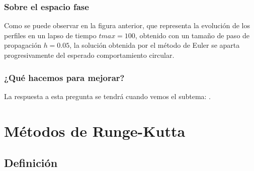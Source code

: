 \documentclass[12pt]{beamer}
\begin{document}
\begin{frame}
\frametitle{Sobre el espacio fase}
Como se puede observar en la figura anterior, que representa la evolución de los perfiles en un lapso de tiempo $tmax = 100$, obtenido con un tamaño de paso de propagación $h = 0.05$, la solución obtenida por el método de Euler se aparta progresivamente del esperado comportamiento circular.
\end{frame}
\begin{frame}
\frametitle{¿Qué hacemos para mejorar?}
La respuesta a esta pregunta se tendrá cuando vemos el subtema: \pause {}.
\end{frame}

\section{Métodos de Runge-Kutta}
\subsection{Definición}
\end{document}
